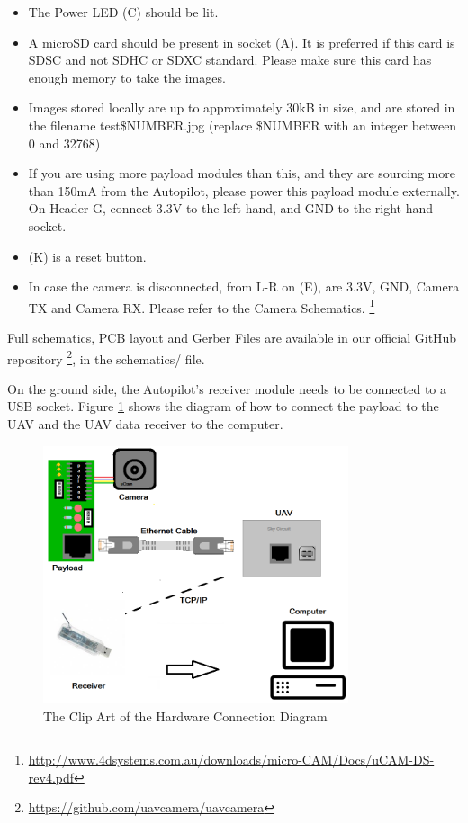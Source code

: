 \documentclass[a4paper,11pt]{article}
\begin{document}
\begin{itemize}
	\item The Power LED (C) should be lit.
	\item A microSD card should be present in socket (A). It is preferred if 
this card is SDSC and not SDHC or SDXC standard. Please make sure this card 
has enough memory to take the images.
	\item Images stored locally are up to approximately 30kB in size, and 
are stored in the filename test\$NUMBER.jpg (replace \$NUMBER with an integer between 0 and 32768)
	\item If you are using more payload modules than this, and they are 
sourcing more than 150mA from the Autopilot, please power this payload module 
externally. On Header G, connect 3.3V to the left-hand, and GND to the 
right-hand socket.
	\item (K) is a reset button. 
	\item In case the camera is disconnected, from L-R on (E), are 3.3V, 
GND, Camera TX and Camera RX. Please refer to the Camera Schematics. \footnote{\url{http://www.4dsystems.com.au/downloads/micro-CAM/Docs/uCAM-DS-rev4.pdf}}
\end{itemize}

Full schematics, PCB layout and Gerber Files are available in our official GitHub repository \footnote{\url{https://github.com/uavcamera/uavcamera}}, 
in the schematics/ file.

On the ground side, the Autopilot's receiver module needs to be connected to a USB socket.
Figure \ref{clipArt} shows the diagram of how to connect the payload to the UAV and the UAV data receiver to the computer. 

\begin{figure}[!htbp]
\begin{center}
\includegraphics[width=0.8\textwidth]{clipArt.png} 
\caption{The Clip Art of the Hardware Connection Diagram \label{clipArt}}
\end{center}
\end{figure}
\end{document}
